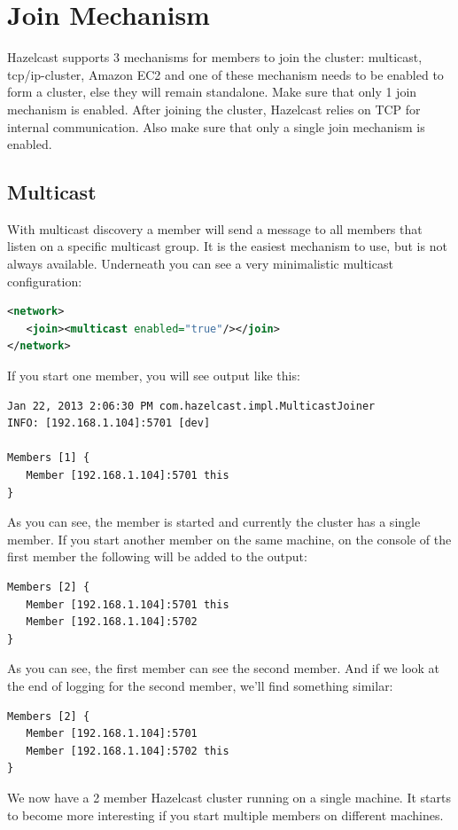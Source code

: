 \section{Join Mechanism }
Hazelcast supports 3 mechanisms for members to join the cluster: multicast, tcp/ip-cluster, Amazon EC2 and one of these mechanism needs to be enabled to form a cluster, else they will remain standalone. Make sure that only 1 join mechanism is enabled. After joining the cluster, Hazelcast relies on TCP for internal communication. Also make sure that only a single join mechanism is enabled.

\subsection{Multicast}
With multicast discovery a member will send a message to all members that listen on a specific multicast group. It is the easiest mechanism to use, but is not always available. Underneath you can see a very minimalistic multicast configuration:
\begin{lstlisting}[language=xml]
<network>
   <join><multicast enabled="true"/></join>
</network>
\end{lstlisting}
If you start one member, you will see output like this:
\begin{lstlisting}
Jan 22, 2013 2:06:30 PM com.hazelcast.impl.MulticastJoiner
INFO: [192.168.1.104]:5701 [dev] 

Members [1] {
   Member [192.168.1.104]:5701 this
}
\end{lstlisting}	
As you can see, the member is started and currently the cluster has a single member. If you start another member on the same machine, on the console of the first member the following will be added to the output:
\begin{lstlisting}
Members [2] {
   Member [192.168.1.104]:5701 this
   Member [192.168.1.104]:5702
}
\end{lstlisting}	
As you can see, the first member can see the second member. And if we look at the end of logging for the second member, we'll find something similar:
\begin{lstlisting}
Members [2] {
   Member [192.168.1.104]:5701
   Member [192.168.1.104]:5702 this
}
\end{lstlisting}		
We now have a 2 member Hazelcast cluster running on a single machine. It starts to become more interesting if you start multiple members on different machines.

